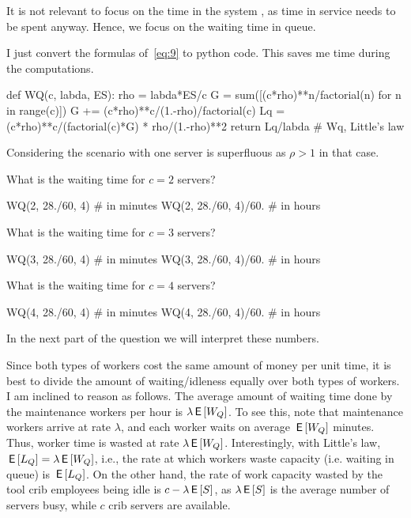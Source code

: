 \begin{exercise}
\begin{solution}
It is not relevant to focus on the time in the system , as time
  in service needs to be spent anyway. Hence, we focus on the waiting
  time in queue.


I just convert the formulas of~\eqref{eq:9} to python code. This saves
me time during the computations.

\begin{pyconsole}
def WQ(c, labda, ES):
    rho = labda*ES/c
    G = sum([(c*rho)**n/factorial(n) for n in range(c)])
    G += (c*rho)**c/(1.-rho)/factorial(c)
    Lq = (c*rho)**c/(factorial(c)*G) * rho/(1.-rho)**2
    return Lq/labda # Wq, Little's law

\end{pyconsole} 

Considering the scenario with one server is superfluous as $\rho>1$ in
that case.

What is the waiting time for $c=2$ servers?

\begin{pyconsole}
WQ(2, 28./60, 4) # in minutes
WQ(2, 28./60, 4)/60. # in hours
\end{pyconsole}

What is the waiting time for $c=3$ servers?

\begin{pyconsole}
WQ(3, 28./60, 4)   # in minutes
WQ(3, 28./60, 4)/60. # in hours
\end{pyconsole}


What is the waiting time for $c=4$ servers?

\begin{pyconsole}
WQ(4, 28./60, 4) # in minutes
WQ(4, 28./60, 4)/60. # in hours
\end{pyconsole} 

In the next  part of the question we will interpret these numbers.

Since both types of workers cost the same amount of money per unit
time, it is best to divide the amount of waiting/idleness equally over
both types of workers.  I am inclined to reason as follows. The
average amount of waiting time done by the maintenance workers per
hour is $\lambda \,\mathsf{E}\left[W_Q\right]$. To see this, note that maintenance workers arrive at rate $\lambda$, and each worker waits on average $\,\mathsf{E}\left[W_Q\right]$ minutes. Thus, worker time is wasted at rate $\lambda \,\mathsf{E}\left[W_Q\right]$. Interestingly, with Little's law, $\,\mathsf{E}\left[L_Q\right]=\lambda \,\mathsf{E}\left[W_Q\right]$, i.e., the rate at which workers waste capacity (i.e.  waiting in queue) is $\,\mathsf{E}\left[L_Q\right]$. On the other hand, the  rate of work capacity wasted by the tool crib employees being idle is $c-\lambda \,\mathsf{E}\left[S\right]$, as $\lambda \,\mathsf{E}\left[S\right]$ is the average number of servers busy, while $c$ crib servers are available.


\end{solution}
\end{exercise}
